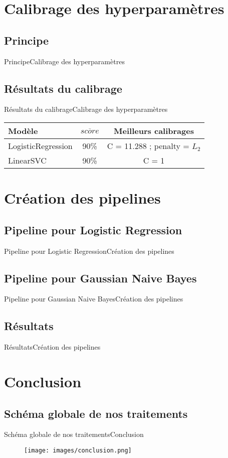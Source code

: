 \documentclass[usenames,dvipsnames]{beamer}
\newcommand*\mean[1]{\overline{#1}}
\begin{document}
\section{Calibrage des hyperparamètres}
\subsection{Principe}
\begin{frame}{Principe}{Calibrage des hyperparamètres}
\end{frame}

\subsection{Résultats du calibrage}
\begin{frame}{Résultats du calibrage}{Calibrage des hyperparamètres}
\begin{tabular}{|p{5cm}|c|c|}
  \hline
  \textbf{Modèle} & $\mean{score}$ & \textbf{Meilleurs calibrages}\\
  \hline
  \hline
  LogisticRegression & 90\% & C = 11.288 ; penalty = $L_2$\\
  \hline
  LinearSVC & 90\% & C = 1\\
  \hline
\end{tabular}
\end{frame}

\section{Création des pipelines}
\subsection{Pipeline pour Logistic Regression}
\begin{frame}{Pipeline pour Logistic Regression}{Création des pipelines}
\end{frame}

\subsection{Pipeline pour Gaussian Naive Bayes}
\begin{frame}{Pipeline pour Gaussian Naive Bayes}{Création des pipelines}
\end{frame}

\subsection{Résultats}
\begin{frame}{Résultats}{Création des pipelines}
\end{frame}

\section{Conclusion}
\subsection{Schéma globale de nos traitements}
\begin{frame}{Schéma globale de nos traitements}{Conclusion}
\begin{figure}
    \centering
    \texttt{[image: images/conclusion.png]}
\end{figure}
\end{frame}
\end{document}

